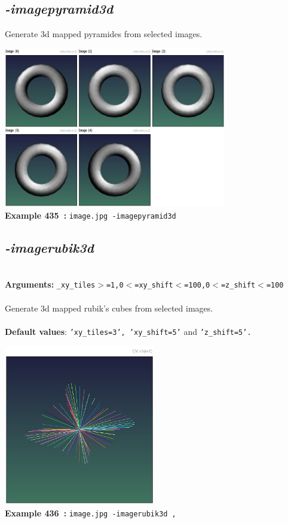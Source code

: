 \documentclass[a4paper,11pt,twoside]{book}
\begin{document}
\subsection{\emph{-imagepyramid3d} }\vspace*{-0.5em}
Generate 3d mapped pyramides from selected images.
\begin{center}\includegraphics[keepaspectratio=true,height=7cm,width=\textwidth]{img/gmic_def435.jpg}\\
{\footnotesize \textbf{Example 435~:} \texttt{image.jpg -imagepyramid3d}}
\end{center}

\subsection{\emph{-imagerubik3d} }\vspace*{-0.5em}
~\\\textbf{Arguments: } 
{\small \texttt{\_xy\_tiles$>$=1,0$<$=xy\_shift$<$=100,0$<$=z\_shift$<$=100}}\\~\\
Generate 3d mapped rubik's cubes from selected images.
~\\~\\\textbf{Default values}: {\small \texttt{'xy\_tiles=3', 'xy\_shift=5'} and \texttt{'z\_shift=5'.}}
\begin{center}\includegraphics[keepaspectratio=true,height=7cm,width=\textwidth]{img/gmic_def436.jpg}\\
{\footnotesize \textbf{Example 436~:} \texttt{image.jpg -imagerubik3d ,}}
\end{center}
\end{document}
